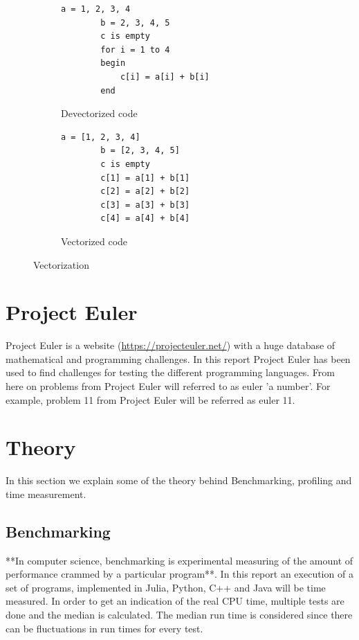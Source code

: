 \documentclass[a4paper, 11pt, titlepage]{article}
\begin{document}
\begin{figure}[H]
	\centering
	\begin{subfigure}[H]{0.7\textwidth}
		\centering
		\begin{lstlisting}[belowskip=0.5mm]
		a = 1, 2, 3, 4
		b = 2, 3, 4, 5
		c is empty
		for i = 1 to 4
		begin
			c[i] = a[i] + b[i]
		end
		\end{lstlisting}
		\caption{Devectorized code}
	\end{subfigure}
	\begin{subfigure}[H]{0.7\textwidth}
		\centering
		\begin{lstlisting}[belowskip=0.5mm]
		a = [1, 2, 3, 4]
		b = [2, 3, 4, 5]
		c is empty
		c[1] = a[1] + b[1]
		c[2] = a[2] + b[2]
		c[3] = a[3] + b[3]
		c[4] = a[4] + b[4]
		\end{lstlisting}
		\caption{Vectorized code}
	\end{subfigure}	
	\caption{Vectorization}
	\label{vec}
\end{figure}

\section{Project Euler}
Project Euler is a website (\url{https://projecteuler.net/}) with a huge database of mathematical and programming challenges. In this report Project Euler has been used to find challenges for testing the different programming languages. From here on problems from Project Euler will referred to as euler 'a number'. For example, problem 11 from Project Euler will be referred as euler 11.

\section{Theory}
In this section we explain some of the theory behind Benchmarking, profiling and time measurement.
\subsection{Benchmarking}
**In computer science, benchmarking is experimental measuring of the amount of performance crammed by a particular program**. In this report an execution of a set of programs, implemented in Julia, Python, C++ and Java will be time measured. In order to get an indication of the real CPU time, multiple tests are done and the median is calculated. The median run time is considered since there can be fluctuations in run times for every test.
\end{document}
